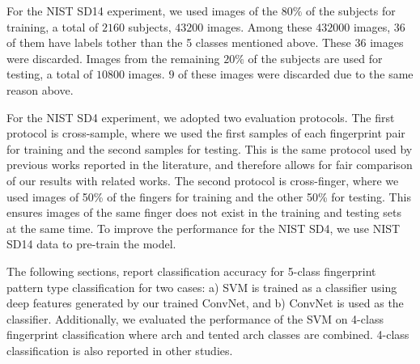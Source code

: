 For the NIST SD14 experiment, we used images of the $80\%$ of the subjects for training, a total of $2160$ subjects, $43200$ images. Among these $432000$ images, $36$ of them have labels tother than the 5 classes mentioned above. These $36$ images were discarded. 
Images from the remaining $20\%$ of the subjects are used for testing, a total of $10800$ images. $9$ of these images were discarded due to the same reason above.
%

For the NIST SD4 experiment, we adopted two evaluation protocols.
%
The first protocol is cross-sample, where we used the first samples of each fingerprint pair for training and the second samples for testing.  This is the same protocol used by previous works reported in the literature, and therefore allows for fair comparison of our results with related works.
The second protocol is cross-finger, where we used images of 50\% of the fingers for training and the other 50\% for testing. This ensures images of the same finger does not exist in the training and testing sets at the same time. To improve the performance for the NIST SD4, we use NIST SD14 data to pre-train the model.
 
The following sections, report classification accuracy for 5-class fingerprint pattern type classification for two cases: a) SVM is trained as a classifier using deep features generated by our trained ConvNet, and b) ConvNet is used as the classifier.
Additionally, we evaluated the performance of the SVM on 4-class fingerprint classification where arch and tented arch classes are combined. 4-class classification is also reported in other studies.  
%

